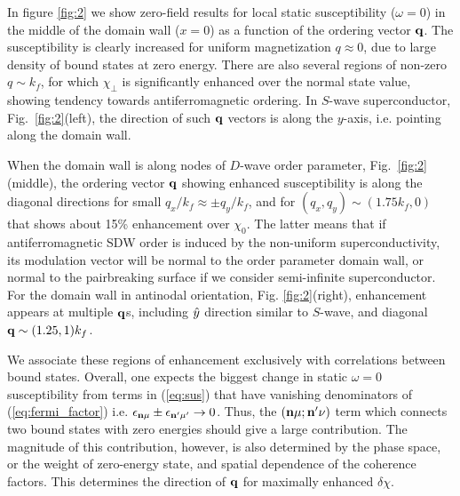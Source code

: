 \documentclass[prb,aps,showpacs,amsmath,twocolumn,10pt]{revtex4-1}
\begin{document}
In figure \ref{fig:2} we show zero-field results for local static
susceptibility ($\omega=0$) in the middle of the domain wall ($x=0$) 
as a function of the ordering vector ${\bf q}$. 
The susceptibility is clearly increased for uniform magnetization $q\approx0$,
due to large density of bound states at zero energy. There are also several
regions of non-zero $q \sim k_f$, for which $\chi_\perp$ is significantly
enhanced over the normal state value, showing tendency towards
antiferromagnetic ordering.  In $S$-wave superconductor,
Fig.~\ref{fig:2}(left), the direction of such ${\bf q}$ vectors is along the
$y$-axis, i.e. pointing along the domain wall.
%

When the domain wall is along nodes of $D$-wave order parameter,
Fig.~\ref{fig:2}(middle), the ordering vector ${\bf q}$ showing enhanced
susceptibility is along the diagonal directions for small $q_x/k_f \approx \pm
q_y/k_f$, and for $(q_x, q_y) \sim (1.75 k_f, 0)$ that shows about 15\% enhancement over
$\chi_0$.  The latter means that if antiferromagnetic SDW order is induced by
the non-uniform superconductivity, its modulation vector will be normal to the
order parameter domain wall, or normal to the pairbreaking surface if we
consider semi-infinite superconductor. For the domain wall in antinodal orientation, Fig. \ref{fig:2}(right), enhancement appears at multiple ${\bf q}$s, including $\hat{y}$ direction similar to $S$-wave, and diagonal ${\bf q}\sim(1.25,1)k_f$.

We associate these regions of enhancement exclusively with correlations between bound states. 
Overall, one expects the biggest change in static $\omega=0$ susceptibility from terms in 
(\ref{eq:sus}) that have vanishing denominators of (\ref{eq:fermi_factor}) i.e.  
$\epsilon_{{\bf n}\mu}\pm\epsilon_{{\bf n}'\mu'} \to 0 $. 
Thus, the $({\bf n}\mu;{\bf n}'\nu)$ term
which connects two bound states with zero energies should give a large contribution. 
The magnitude of this contribution, however, is also determined by the phase space, 
or the weight of zero-energy state,
and spatial dependence of the coherence factors. 
This determines the direction of ${\bf q}$ for maximally enhanced $\delta \chi$.
\end{document}
